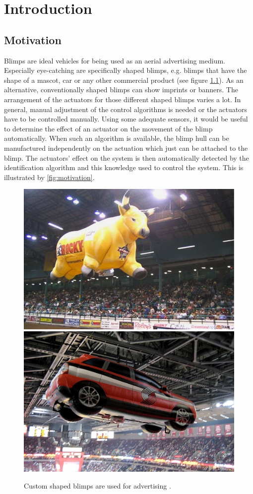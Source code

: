 \chapter{Introduction}
\label{chap:introduction}

\section{Motivation}
Blimps are ideal vehicles for being used as an aerial advertising medium.
Especially eye-catching are specifically shaped blimps, e.g. blimps that have the shape of a mascot, car or any other commercial product (see figure \ref{fig:blimps}).
As an alternative, conventionally shaped blimps can show imprints or banners.
The arrangement of the actuators for those different shaped blimps varies a lot.
In general, manual adjustment of the control algorithms is needed or the actuators have to be controlled manually.
Using some adequate sensors, it would be useful to determine the effect of an actuator on the movement of the blimp automatically.
When such an algorithm is available, the blimp hull can be manufactured independently on the actuation which just can be attached to the blimp.
The actuators' effect on the system is then automatically detected by the identification algorithm and this knowledge used to control the system.
This is illustrated by \cref{fig:motivation}.

\begin{figure}[hbtp]
\centering
\includegraphics[width=.45\linewidth]{images/CustomBull_Lg.jpg}
\includegraphics[width=.45\linewidth]{images/CustomCar.jpg}
\caption{Custom shaped blimps are used for advertising \citep{rcblimps}.}
\label{fig:blimps}
\end{figure}

